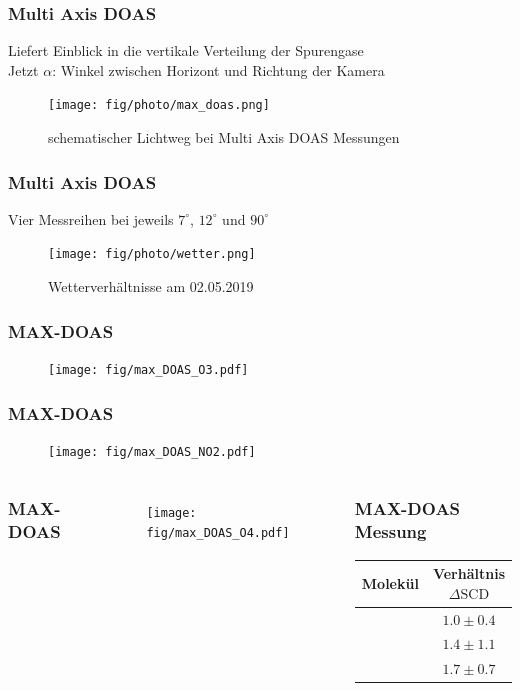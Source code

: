 \documentclass{beamer}
\begin{document}
\begin{frame}
    \frametitle{Multi Axis DOAS}
    Liefert Einblick in die vertikale Verteilung der Spurengase \\
    Jetzt $\alpha$: Winkel zwischen Horizont und Richtung der Kamera
    \begin{figure}
        \texttt{[image: fig/photo/max\_doas.png]}
        \caption{schematischer Lichtweg bei Multi Axis DOAS Messungen}
    \end{figure}
\end{frame}

\begin{frame}
    \frametitle{Multi Axis DOAS}
    Vier Messreihen bei jeweils $7^\circ$, $12^\circ$ und $90^\circ$ \\
    \begin{figure}
    	\texttt{[image: fig/photo/wetter.png]}
    	\caption{Wetterverhältnisse am 02.05.2019}
    \end{figure}
\end{frame}

\begin{frame}
    \frametitle{MAX-DOAS }
    \begin{figure}
    	\texttt{[image: fig/max\_DOAS\_O3.pdf]}
    \end{figure}
\end{frame}

\begin{frame}
    \frametitle{MAX-DOAS }
    \begin{figure}
    	\texttt{[image: fig/max\_DOAS\_NO2.pdf]}
    \end{figure}
\end{frame}


\begin{frame}
\begin{columns}
    \frametitle{MAX-DOAS }
    \vspace{-1cm}
    \begin{figure}
    	\texttt{[image: fig/max\_DOAS\_O4.pdf]}
    \end{figure}
	\begin{center}
		\frametitle{MAX-DOAS Messung}
		\begin{tabular*}{\linewidth}{c c}
			\toprule
			Molekül & Verhältnis $\Delta \text{SCD}$ \\
			\midrule
			\ch{O3} & $1.0 \pm 0.4$ \\
			\ch{NO2} & $1.4 \pm 1.1$ \\
			\ch{O4} & $1.7 \pm 0.7$\\
			\bottomrule
		\end{tabular*}
		\label{fig:ratio_dscd}
	\end{center}
\end{columns}
\end{frame}
\end{document}

